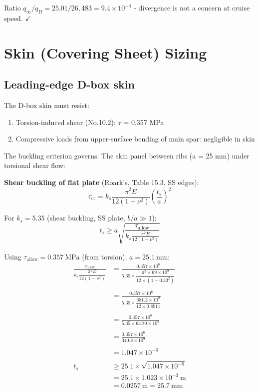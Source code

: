 \documentclass[10pt,a4paper]{article}
\begin{document}
Ratio $q_\infty / q_D = 25.01 / 26{,}483 = 9.4 \times 10^{-4}$ - divergence is not a concern at cruise speed. $\checkmark $

\newpage \section{Skin (Covering Sheet) Sizing}

\subsection{Leading-edge D-box skin}

The D-box skin must resist:
\begin{enumerate}[noitemsep,topsep=2pt]
\item Torsion-induced shear (No.10.2): ${\tau}$ = 0.357 MPa
\item Compressive loads from upper-surface bending of main spar: negligible in skin
\end{enumerate}

The buckling criterion governs. The skin panel between ribs (a = 25 mm) under torsional shear flow:

\textbf{Shear buckling of flat plate} (Roark's, Table 15.3, SS edges):
\[
\tau_{\text{cr}} = k_s \frac{\pi^2 E}{12(1-\nu^2)} \left(\frac{t_s}{a}\right)^2
\]

For $k_s = 5.35$ (shear buckling, SS plate, $b/a \gg 1$):
\[
t_s \geq a \sqrt{\frac{\tau_{\text{allow}}}{k_s \frac{\pi^2 E}{12(1-\nu^2)}}}
\]

Using $\tau_{\text{allow}} = 0.357\ \text{MPa}$ (from torsion), $a = 25.1\ \text{mm}$:
\begin{align*}
\frac{\tau_{\text{allow}}}{k_s \dfrac{\pi^2 E}{12(1-\nu^2)}} 
&= \frac{0.357 \times 10^6}{5.35 \times \dfrac{\pi^2 \times 69 \times 10^9}{12 \times (1-0.33^2)}} \\
\\
&= \frac{0.357 \times 10^6}{5.35 \times \dfrac{681.2 \times 10^9}{12 \times 0.8911}} \\
\\
&= \frac{0.357 \times 10^6}{5.35 \times 63.70 \times 10^9} \\
\\
&= \frac{0.357 \times 10^6}{340.8 \times 10^9} \\
\\
&= 1.047 \times 10^{-6} \\
\\
t_s &\geq 25.1 \times \sqrt{1.047 \times 10^{-6}} \\
&= 25.1 \times 1.023 \times 10^{-3}\ \text{m} \\
&= 0.0257\ \text{m} = 25.7\ \text{mm}
\end{align*}
\end{document}
